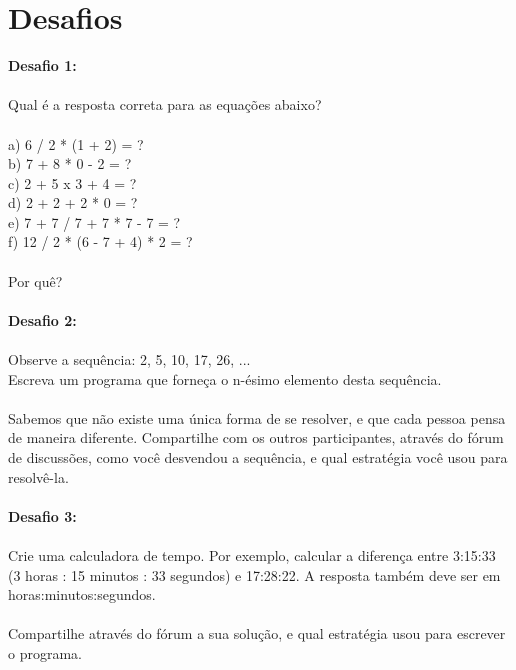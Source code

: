 \chapter{Desafios}\label{ane:desafios}

\noindent
\textbf{Desafio 1:} \\
\\
Qual é a resposta correta para as equações abaixo?\\
\\
a) 6 / 2 * (1 + 2) = ?\\
b) 7 + 8 * 0 - 2 = ?\\
c) 2 + 5 x 3 + 4 = ?\\
d) 2 + 2 + 2 * 0 = ?\\
e) 7 + 7 / 7 + 7 * 7 - 7 = ?\\
f) 12 / 2 * (6 - 7 + 4) * 2 = ?\\
\\
Por quê?\\
\\
\textbf{Desafio 2:} \\
\\
Observe a sequência: 2, 5, 10, 17, 26, ... \\
Escreva um programa que forneça o n-ésimo elemento desta sequência.\\
\\
Sabemos que não existe uma única forma de se resolver, e que cada pessoa pensa de maneira diferente. Compartilhe com os
outros participantes, através do fórum de discussões, como você desvendou a sequência, e qual estratégia você usou para
resolvê-la.\\
\\
\textbf{Desafio 3:} \\
\\
Crie uma calculadora de tempo. Por exemplo, calcular a diferença entre 3:15:33 (3 horas : 15 minutos : 33 segundos) e
17:28:22. A resposta também deve ser em horas:minutos:segundos.\\
\\
Compartilhe através do fórum a sua solução, e qual estratégia usou para escrever o programa.\\
